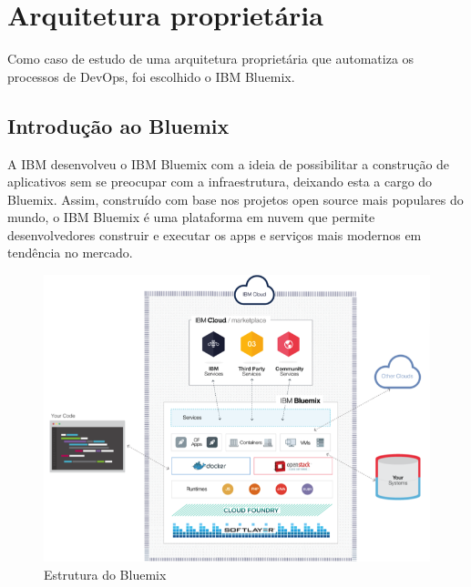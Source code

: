 




\section{Arquitetura proprietária}

Como caso de estudo de uma arquitetura proprietária que automatiza os processos de DevOps, foi escolhido o IBM Bluemix.
\subsection{Introdução ao Bluemix}

A IBM desenvolveu o IBM Bluemix com a ideia de possibilitar a construção de aplicativos sem se preocupar com a infraestrutura, deixando esta a cargo do Bluemix. Assim, construído com base nos projetos open source mais populares do mundo, o IBM Bluemix é uma plataforma em nuvem que permite desenvolvedores construir e executar os apps e serviços mais modernos em tendência no mercado.

\begin{figure}[!htb]
  \centering
  \includegraphics{imagens/estrutura}
  \caption{Estrutura do Bluemix}
  \label{Rotulo}
\end{figure}

